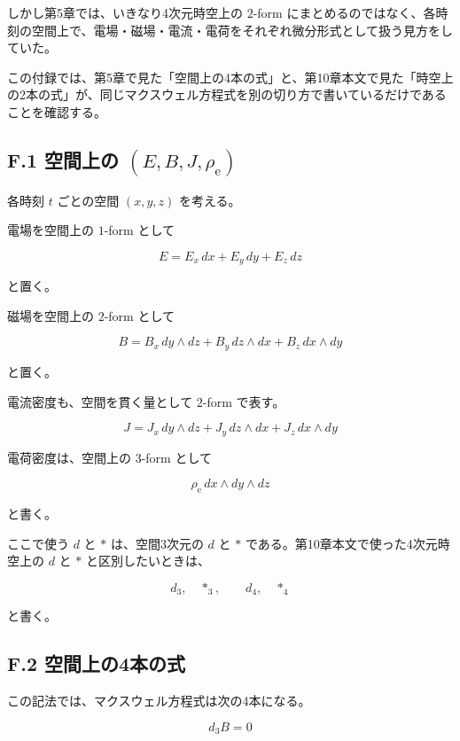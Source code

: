 \documentclass[a4paper,12pt,openany]{book}
\begin{document}
しかし第5章では、いきなり4次元時空上の \(2\)-form
にまとめるのではなく、各時刻の空間上で、電場・磁場・電流・電荷をそれぞれ微分形式として扱う見方をしていた。

この付録では、第5章で見た「空間上の4本の式」と、第10章本文で見た「時空上の2本の式」が、同じマクスウェル方程式を別の切り方で書いているだけであることを確認する。

\hypertarget{f.1-ux7a7aux9593ux4e0aux306e-ebjrho_mathrm-e}{%
\subsection*{\texorpdfstring{F.1 空間上の
\((E,B,J,\rho_{\mathrm e})\)}{F.1 空間上の (E,B,J,\textbackslash rho\_\{\textbackslash mathrm e\})}}\label{f.1-ux7a7aux9593ux4e0aux306e-ebjrho_mathrm-e}}

各時刻 \(t\) ごとの空間 \((x,y,z)\) を考える。

電場を空間上の \(1\)-form として

\[
E = E_x\,dx + E_y\,dy + E_z\,dz
\]

と置く。

磁場を空間上の \(2\)-form として

\[
B = B_x\,dy\wedge dz + B_y\,dz\wedge dx + B_z\,dx\wedge dy
\]

と置く。

電流密度も、空間を貫く量として \(2\)-form で表す。

\[
J = J_x\,dy\wedge dz + J_y\,dz\wedge dx + J_z\,dx\wedge dy
\]

電荷密度は、空間上の \(3\)-form として

\[
\rho_{\mathrm e}\,dx\wedge dy\wedge dz
\]

と書く。

ここで使う \(d\) と \(\ast\) は、空間3次元の \(d\) と \(\ast\)
である。第10章本文で使った4次元時空上の \(d\) と \(\ast\)
と区別したいときは、

\[
d_3,\quad \ast_3,
\qquad
d_4,\quad \ast_4
\]

と書く。

\hypertarget{f.2-ux7a7aux9593ux4e0aux306e4ux672cux306eux5f0f}{%
\subsection*{F.2
空間上の4本の式}\label{f.2-ux7a7aux9593ux4e0aux306e4ux672cux306eux5f0f}}

この記法では、マクスウェル方程式は次の4本になる。

\[
d_3B=0
\]
\end{document}
